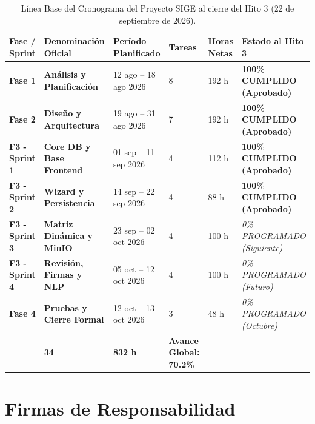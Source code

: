 \documentclass[12pt,a4paper]{article}
\begin{document}
\begin{table}[H]
\centering
\small
\renewcommand{\arraystretch}{1.2}
\begin{tabularx}{\textwidth}{|>{\hsize=0.6\hsize\centering\arraybackslash\footnotesize}X|>{\hsize=1.3\hsize\raggedright\arraybackslash\bfseries\footnotesize}X|>{\hsize=1.1\hsize\centering\arraybackslash\footnotesize}X|>{\hsize=0.5\hsize\centering\arraybackslash\footnotesize}X|>{\hsize=0.6\hsize\centering\arraybackslash\footnotesize}X|>{\hsize=1.9\hsize\centering\arraybackslash\footnotesize}X|}
\hline
\rowcolor{tableheader}
\textbf{Fase / Sprint} & \textbf{Denominación Oficial} & \textbf{Período Planificado} & \textbf{Tareas} & \textbf{Horas Netas} & \textbf{Estado al Hito 3} \\
\hline
\textbf{Fase 1} & Análisis y Planificación & 12 ago -- 18 ago 2026 & 8 & 192 h & \textbf{100\% CUMPLIDO (Aprobado)} \\
\hline
\textbf{Fase 2} & Diseño y Arquitectura & 19 ago -- 31 ago 2026 & 7 & 192 h & \textbf{100\% CUMPLIDO (Aprobado)} \\
\hline
\textbf{F3 - Sprint 1} & Core DB y Base Frontend & 01 sep -- 11 sep 2026 & 4 & 112 h & \textbf{100\% CUMPLIDO (Aprobado)} \\
\hline
\textbf{F3 - Sprint 2} & Wizard y Persistencia & 14 sep -- 22 sep 2026 & 4 & 88 h & \textbf{100\% CUMPLIDO (Aprobado)} \\
\hline
\textbf{F3 - Sprint 3} & Matriz Dinámica y MinIO & 23 sep -- 02 oct 2026 & 4 & 100 h & \textit{0\% PROGRAMADO (Siguiente)} \\
\hline
\textbf{F3 - Sprint 4} & Revisión, Firmas y NLP & 05 oct -- 12 oct 2026 & 4 & 100 h & \textit{0\% PROGRAMADO (Futuro)} \\
\hline
\textbf{Fase 4} & Pruebas y Cierre Formal & 12 oct -- 13 oct 2026 & 3 & 48 h & \textit{0\% PROGRAMADO (Octubre)} \\
\hline
\multicolumn{3}{|r|}{\textbf{TOTAL GENERAL DEL PROYECTO:}} & \textbf{34} & \textbf{832 h} & \textbf{Avance Global: 70.2\%} \\
\hline
\end{tabularx}
\caption{Línea Base del Cronograma del Proyecto SIGE al cierre del Hito 3 (22 de septiembre de 2026).}
\label{tab:linea_base_hito3}
\end{table}

\section{Firmas de Responsabilidad}
\end{document}
